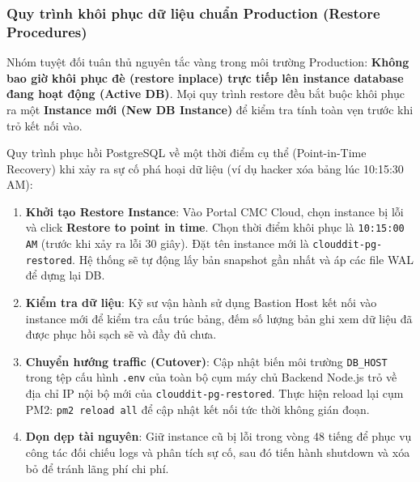 \documentclass[12pt, a4paper]{article}
\begin{document}
\subsubsection{Quy trình khôi phục dữ liệu chuẩn Production (Restore Procedures)}
Nhóm tuyệt đối tuân thủ nguyên tắc vàng trong môi trường Production: \textbf{Không bao giờ khôi phục đè (restore inplace) trực tiếp lên instance database đang hoạt động (Active DB)}. Mọi quy trình restore đều bắt buộc khôi phục ra một \textbf{Instance mới (New DB Instance)} để kiểm tra tính toàn vẹn trước khi trỏ kết nối vào.

Quy trình phục hồi PostgreSQL về một thời điểm cụ thể (Point-in-Time Recovery) khi xảy ra sự cố phá hoại dữ liệu (ví dụ hacker xóa bảng lúc 10:15:30 AM):
\begin{enumerate}
    \item \textbf{Khởi tạo Restore Instance}: Vào Portal CMC Cloud, chọn instance bị lỗi và click \textbf{Restore to point in time}. Chọn thời điểm khôi phục là \texttt{10:15:00 AM} (trước khi xảy ra lỗi 30 giây). Đặt tên instance mới là \texttt{clouddit-pg-restored}. Hệ thống sẽ tự động lấy bản snapshot gần nhất và áp các file WAL để dựng lại DB.
    \item \textbf{Kiểm tra dữ liệu}: Kỹ sư vận hành sử dụng Bastion Host kết nối vào instance mới để kiểm tra cấu trúc bảng, đếm số lượng bản ghi xem dữ liệu đã được phục hồi sạch sẽ và đầy đủ chưa.
    \item \textbf{Chuyển hướng traffic (Cutover)}: Cập nhật biến môi trường \texttt{DB\_HOST} trong tệp cấu hình \texttt{.env} của toàn bộ cụm máy chủ Backend Node.js trỏ về địa chỉ IP nội bộ mới của \texttt{clouddit-pg-restored}. Thực hiện reload lại cụm PM2: \texttt{pm2 reload all} để cập nhật kết nối tức thời không gián đoạn.
    \item \textbf{Dọn dẹp tài nguyên}: Giữ instance cũ bị lỗi trong vòng 48 tiếng để phục vụ công tác đối chiếu logs và phân tích sự cố, sau đó tiến hành shutdown và xóa bỏ để tránh lãng phí chi phí.
\end{enumerate}
\end{document}
